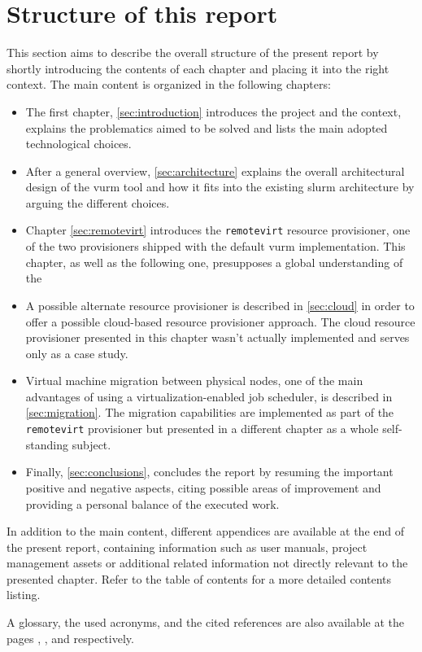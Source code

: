 \section{Structure of this report}
\label{sec:structure}

This section aims to describe the overall structure of the present report by shortly introducing the contents of each chapter and placing it into the right context. The main content is organized in the following chapters:

\begin{itemize}
	\item The first chapter, \autoref{sec:introduction} introduces the project and the context, explains the problematics aimed to be solved and lists the main adopted technological choices.
	\item After a general overview, \autoref{sec:architecture} explains the overall architectural design of the \gls{vurm} tool and how it fits into the existing \gls{slurm} architecture by arguing the different choices.
	\item Chapter \ref{sec:remotevirt} introduces the \texttt{remotevirt} resource provisioner, one of the two provisioners shipped with the default \gls{vurm} implementation. This chapter, as well as the following one, presupposes a global understanding of the
	\item A possible alternate resource provisioner is described in \autoref{sec:cloud} in order to offer a possible cloud-based resource provisioner approach. The cloud resource provisioner presented in this chapter wasn't actually implemented and serves only as a case study.
	\item Virtual machine migration between physical nodes, one of the main advantages of using a virtualization-enabled job scheduler, is described in \autoref{sec:migration}. The migration capabilities are implemented as part of the \texttt{remotevirt} provisioner but presented in a different chapter as a whole self-standing subject.
	\item Finally, \autoref{sec:conclusions}, concludes the report by resuming the important positive and negative aspects, citing possible areas of improvement and providing a personal balance of the executed work.
\end{itemize}

In addition to the main content, different appendices are available at the end of the present report, containing information such as user manuals, project management assets or additional related information not directly relevant to the presented chapter. Refer to the table of contents for a more detailed contents listing.

A glossary, the used acronyms, and the cited references are also available at the pages \pageref{sec:glossary}, \pageref{sec:acronyms}, and \pageref{sec:references} respectively.
